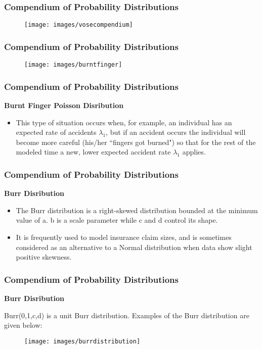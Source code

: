 \documentclass[MAIN.tex]{subfiles}
\begin{document}
\begin{frame}
\frametitle{Compendium of Probability Distributions}
\begin{figure}
\centering
\texttt{[image: images/vosecompendium]}
\end{figure}
\end{frame}
\begin{frame}
	\frametitle{Compendium of Probability Distributions}
		\begin{figure}
\centering
\texttt{[image: images/burntfinger]}

\end{figure}

\end{frame}
\begin{frame}
	\frametitle{Compendium of Probability Distributions}
\textbf{Burnt Finger Poisson Disribution}
\begin{itemize}
\item This type of situation occurs when, for example, an individual has an expected rate of accidents $\lambda_1$, but if an accident occurs the individual will become more careful (his/her ``fingers got burned") so that for the rest of the modeled time a new, lower expected accident rate $\lambda_1$ applies.
\end{itemize}
\end{frame}
\begin{frame}
	\frametitle{Compendium of Probability Distributions}
	\textbf{Burr Disribution}
\begin{itemize}
\item The Burr distribution is a right-skewed distribution bounded at the minimum value of a. b is a scale parameter while c and d control its shape. 

\item It is frequently used to model insurance claim sizes, and is sometimes considered as an alternative to a Normal distribution when data show slight positive skewness.
\end{itemize}
\end{frame}
\begin{frame}
	\frametitle{Compendium of Probability Distributions}
	\textbf{Burr Disribution}

Burr(0,1,c,d) is a unit Burr distribution. 
Examples of the Burr distribution are given below:

\begin{figure}
\centering
\texttt{[image: images/burrdistribution]}
\caption{}
\label{fig:burrdistribution}
\end{figure}


\end{frame}
\end{document}
